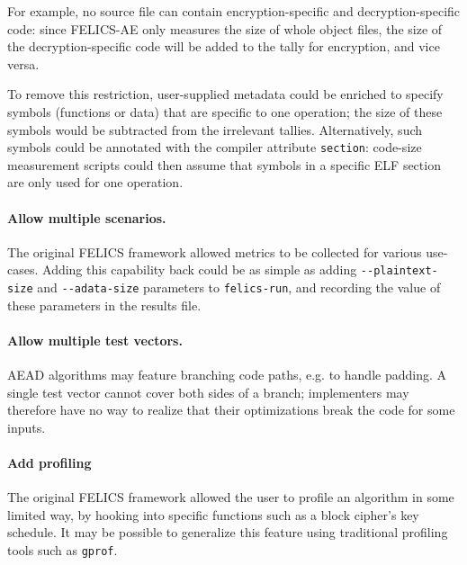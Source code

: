 \documentclass{article}
\begin{document}
For example, no source file can contain encryption-specific and
decryption-specific code: since FELICS-AE only measures the size of
whole object files, the size of the decryption-specific code will be
added to the tally for encryption, and vice versa.

To remove this restriction, user-supplied metadata could be enriched
to specify symbols (functions or data) that are specific to one
operation; the size of these symbols would be subtracted from the
irrelevant tallies.  Alternatively, such symbols could be annotated
with the compiler attribute \texttt{section}: code-size measurement
scripts could then assume that symbols in a specific ELF section are
only used for one operation.

\paragraph{Allow multiple scenarios.}

The original FELICS framework allowed metrics to be collected for
various use-cases.  Adding this capability back could be as simple as
adding \texttt{-{}-plaintext-size} and \texttt{-{}-adata-size}
parameters to \texttt{felics-run}, and recording the value of these
parameters in the results file.

\paragraph{Allow multiple test vectors.}

AEAD algorithms may feature branching code paths, e.g. to handle
padding.  A single test vector cannot cover both sides of a branch;
implementers may therefore have no way to realize that their
optimizations break the code for some inputs.

\paragraph{Add profiling}

The original FELICS framework allowed the user to profile an algorithm
in some limited way, by hooking into specific functions such as a
block cipher's key schedule.  It may be possible to generalize this
feature using traditional profiling tools such as \texttt{gprof}.



\end{document}
